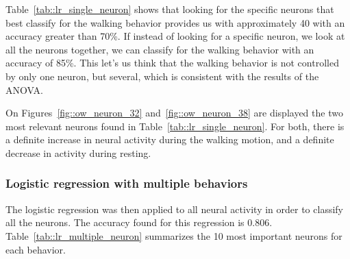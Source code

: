 Table~\ref{tab::lr_single_neuron} shows that looking for the specific neurons that best classify for the walking behavior provides us with approximately 40 with an accuracy greater than 70\%.
If instead of looking for a specific neuron, we look at all the neurons together, we can classify for the walking behavior with an accuracy of 85\%.
This let's us think that the walking behavior is not controlled by only one neuron, but several, which is consistent with the results of the ANOVA.

\vspace{\baselineskip}

On Figures~\ref{fig::ow_neuron_32} and~\ref{fig::ow_neuron_38} are displayed the two most relevant neurons found in Table~\ref{tab::lr_single_neuron}.
For both, there is a definite increase in neural activity during the walking motion, and a definite decrease in activity during resting.

\subsubsection{Logistic regression with multiple behaviors}

The logistic regression was then applied to all neural activity in order to classify all the neurons.
The accuracy found for this regression is 0.806.
Table~\ref{tab::lr_multiple_neuron} summarizes the 10 most important neurons for each behavior.

